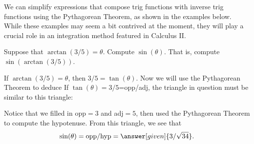 \documentclass{ximera}
\begin{document}
We can simplify expressions that compose trig functions with inverse trig functions using the Pythagorean Theorem, as shown in the examples below. While these examples may seem a bit contrived at the moment, they will play a crucial role in an integration method featured in Calculus II.

\begin{example}
  Suppose that $\arctan(3/5) = \theta$. Compute $\sin(\theta)$. That is, compute $\sin(\arctan(3/5))$.
  \begin{explanation}
    If $\arctan(3/5) = \theta$, then $3/5=\tan(\theta)$.
    Now we will use the Pythagorean Theorem to deduce
If $\tan(\theta)=3/5$=opp/adj, the triangle in question must
    be similar to this triangle:
    \begin{image}[2in]
    \end{image}
    Notice that we filled in opp$=3$ and adj$=5$, then used the Pythagorean Theorem to compute the hypotenuse.
    From this triangle, we see that
    \[
    \sin(\theta) =\mbox{opp/hyp}= \answer[given]{3/\sqrt{34}}.
    \]
  \end{explanation}
\end{example}
\end{document}
